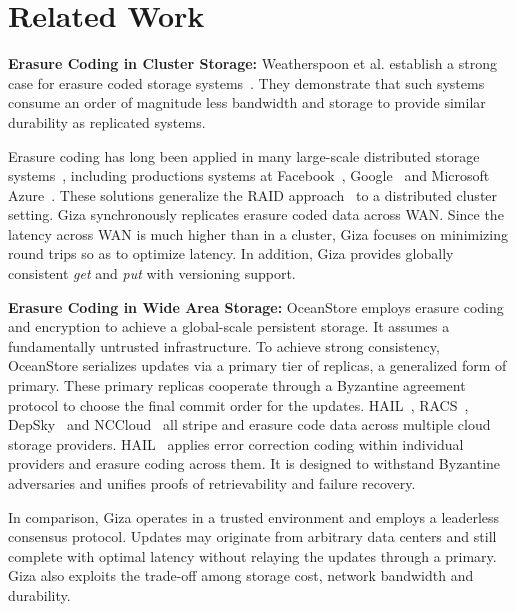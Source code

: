 \section{Related Work}


{\bf Erasure Coding in Cluster Storage:}
Weatherspoon et al. establish a strong case for erasure coded storage
systems~\cite{weatherspoon02erasure}. They demonstrate that such systems consume
an order of magnitude less bandwidth and storage to provide similar durability
as replicated systems.

Erasure coding has long been applied in many large-scale distributed storage
systems~\cite{fab:asplos04, zhang04repstore, haeberlen05glacier, abd05ursa,
  welch08scalable, sathiamoorthy13xoring, zhang16efficient}, including
productions systems at Facebook~\cite{borthakur2010hdfs},
Google~\cite{fikes2010storage, ford10availability} and Microsoft
Azure~\cite{huang12erasure}. These solutions generalize the RAID
approach~\cite{patterson88case, wilkes96hp} to a distributed cluster setting.
Giza synchronously replicates erasure coded data across WAN. Since the latency
across WAN is much higher than in a cluster, Giza focuses on minimizing round
trips so as to optimize latency. In addition, Giza provides globally consistent
{\em get} and {\em put} with versioning support.

{\bf Erasure Coding in Wide Area Storage:}
OceanStore \cite{oceanstore:asplos00, pond:fast03} employs erasure coding and
encryption to achieve a global-scale persistent storage. It assumes a
fundamentally untrusted infrastructure. To achieve strong consistency,
OceanStore serializes updates via a primary tier of replicas, a generalized form
of primary. These primary replicas cooperate through a Byzantine agreement
protocol to choose the final commit order for the updates.
HAIL~\cite{hail:ccs09}, RACS~\cite{racs:socc10}, DepSky~\cite{depsky:eurosys11}
and NCCloud~\cite{nccloud:fast12} all stripe and erasure code data across
multiple cloud storage providers. HAIL~\cite{hail:ccs09} applies error
correction coding within individual providers and erasure coding across them. It
is designed to withstand Byzantine adversaries and unifies proofs of
retrievability and failure recovery.

In comparison, Giza operates in a trusted environment and employs a
leaderless consensus protocol. Updates may originate from arbitrary data centers
and still complete with optimal latency without relaying the updates through a primary. Giza also exploits the trade-off among storage
cost, network bandwidth and durability.

